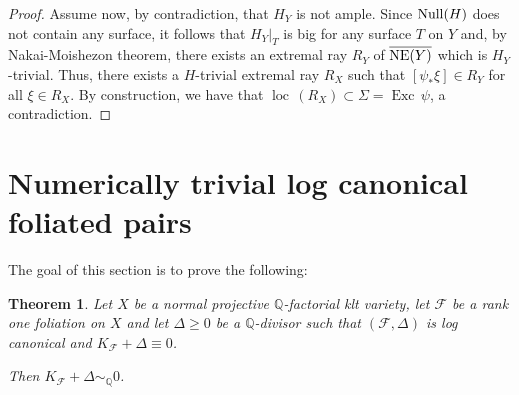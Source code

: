 \documentclass[12pt]{amsart}
\newtheorem{theorem}{Theorem}[section]
\newcommand{\exc}[1]{\operatorname{Exc} \, #1}
\newcommand{\loc}[1]{\operatorname{loc} \, #1}
\begin{document}
\begin{proof}
Assume now, by contradiction, that $H_Y$ is not ample.  Since ${\rm Null}(H)$ does not contain any surface, it follows that $H_Y|_T$ is big for any surface $T$ on $Y$ and, by Nakai-Moishezon theorem, there exists an extremal ray $R_Y$ of $\overline{{\rm NE}(Y)}$ which is $H_Y$-trivial. Thus, there exists a $H$-trivial extremal ray $R_X$ such that $[\psi_*\xi] \in R_Y$ for all $\xi\in R_X$. By construction, we have that $\loc (R_X)\subset \Sigma = \exc \psi$, a contradiction. 
\end{proof}

\section{Numerically trivial log canonical foliated  pairs }

The goal of this section is to prove the following: 

\begin{theorem}\label{t_main}
Let $X$ be a normal projective $\mathbb Q$-factorial klt variety, let $\mathcal F$ be a rank one foliation on $X$ and let $\Delta \ge 0$ be a $\mathbb Q$-divisor such that $(\mathcal F, \Delta)$ is log canonical and 
$K_{\mathcal F}+\Delta \equiv 0$.  

Then $K_{\mathcal F}+\Delta \sim_{\mathbb Q}0$.
\end{theorem}
\end{document}
